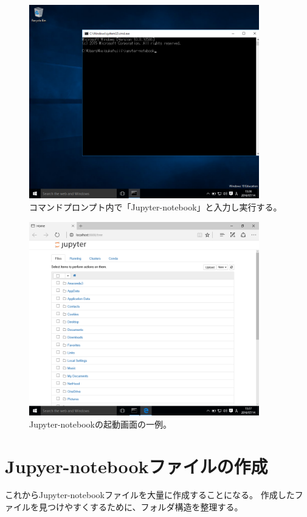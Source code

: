 \begin{figure}
	\centering
	\includegraphics[width=10cm]{TeX_files/fig_python_install/Anaconda_launch2.png}
	\caption{
		\label{fig:Anaconda_launch2}
		コマンドプロンプト内で「Jupyter-notebook」と入力し実行する。
	}
\end{figure}

\begin{figure}
	\centering
	\includegraphics[width=10cm]{TeX_files/fig_python_install/Anaconda_launch3.png}
	\caption{
		\label{fig:Anaconda_launch3}
		Jupyter-notebookの起動画面の一例。
	}
\end{figure}

\section{Jupyer-notebookファイルの作成}
これからJupyter-notebookファイルを大量に作成することになる。
作成したファイルを見つけやすくするために、フォルダ構造を整理する。

